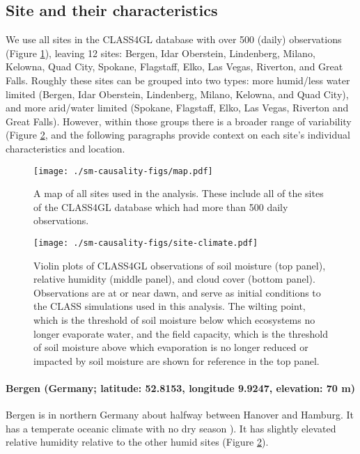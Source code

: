 \documentclass[12pt]{article}
\begin{document}
\subsection{Site and their characteristics}

We use all sites in the CLASS4GL database with over 500 (daily)
observations (Figure \ref{fig:map}), leaving 12 sites: Bergen, Idar
Oberstein, Lindenberg, Milano, Kelowna, Quad City, Spokane, Flagstaff,
Elko, Las Vegas, Riverton, and Great Falls. Roughly these sites can be
grouped into two types: more humid/less water limited (Bergen, Idar
Oberstein, Lindenberg, Milano, Kelowna, and Quad City), and more
arid/water limited (Spokane, Flagstaff, Elko, Las Vegas, Riverton and
Great Falls). However, within those groups there is a broader range of
variability (Figure \ref{fig:site-climate}, and the following
paragraphs provide context on each site's individual characteristics
and location.

\begin{figure}
  \texttt{[image: ./sm-causality-figs/map.pdf]}
  \caption{A map of all sites used in the analysis. These include all
    of the sites of the CLASS4GL database \cite{wouters-class4gl-2019}
    which had more than 500 daily observations.  }
 \label{fig:map}
\end{figure}


\begin{figure}
  \texttt{[image: ./sm-causality-figs/site-climate.pdf]}
  \caption{Violin plots of CLASS4GL observations of soil moisture (top
    panel), relative humidity (middle panel), and cloud cover (bottom
    panel). Observations are at or near dawn, and serve as
    initial conditions to the CLASS simulations used in this
    analysis. The wilting point, which is the threshold of soil
    moisture below which ecosystems no longer evaporate water, and the
    field capacity, which is the threshold of soil moisture above
    which evaporation is no longer reduced or impacted by soil
    moisture are shown for reference in the top panel.}\label{fig:site-climate}
\end{figure}

\paragraph{Bergen (Germany; latitude: 52.8153, longitude 9.9247,
  elevation: 70 m)} Bergen is in northern Germany about halfway
between Hanover and Hamburg. It has a temperate oceanic climate with
no dry season \cite[K\"{o}ppen: Cfb,][]{rubel2010}). It has slightly
elevated relative humidity relative to the other humid sites (Figure
\ref{fig:site-climate}).
\end{document}
